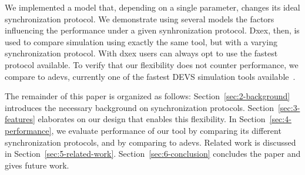 We implemented a model that, depending on a single parameter, changes its ideal synchronization protocol. We demonstrate using several models the factors influencing the performance under a given synhronization protocol.
Dxex, then, is used to compare simulation using exactly the same tool, but with a varying synchronization protocol. With dxex users can always opt to use the fastest protocol available.
To verify that our flexibility does not counter performance, we compare to adevs, currently one of the fastest \textsf{DEVS} simulation tools available~\cite{PythonPDEVS,DEVSSurvey}.


The remainder of this paper is organized as follows:
Section~\ref{sec:2-background} introduces the necessary background on synchronization protocols.
Section~\ref{sec:3-features} elaborates on our design that enables this flexibility.
In Section~\ref{sec:4-performance}, we evaluate performance of our tool by comparing its different synchronization protocols, and by comparing to adevs.
Related work is discussed in Section~\ref{sec:5-related-work}.
Section~\ref{sec:6-conclusion} concludes the paper and gives future work.
